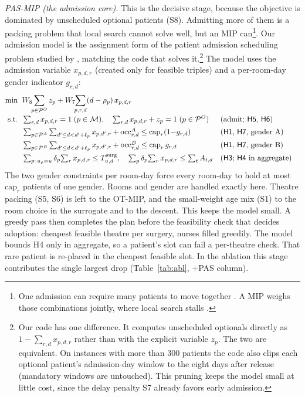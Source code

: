 \documentclass[11pt]{article}
\newcommand{\Sc}[1]{\textsf{S#1}}
\newcommand{\Hc}[1]{\textsf{H#1}}
\begin{document}
	\emph{PAS-MIP (the admission core).} This is the decisive stage, because the objective is dominated
	by unscheduled optional patients (\Sc8). Admitting more of them is a packing problem that local search cannot solve well, but an MIP can\footnote{One admission can require many patients to move together \citep{ceschia2011}. A MIP weighs those combinations jointly, where local search stalls \citep{maniezzo2010}.}. Our admission model is the assignment form of the patient admission scheduling problem studied by \citet{ceschia2011}, matching the code that solves it.\footnote{Our code has one difference. It computes unscheduled optionals directly as $1-\sum_{r,d}x_{p,d,r}$ rather than with the explicit variable $z_p$. The two are equivalent. On instances with more than 300 patients the code also clips each optional patient's admission-day window to the eight days after release (mandatory windows are untouched). This pruning keeps the model small at little cost, since the delay penalty \Sc7 already favors early admission.} The model uses the admission variable $x_{p,d,r}$ (created only for
	feasible triples) and a per-room-day gender indicator $g_{r,d}$:
	{\small
		\begin{align*}
			\min\;\; & W_8\!\!\sum_{p\in\mathcal P^{O}} z_p
			+ W_7\!\!\sum_{p,r,d}(d-\rho_p)\,x_{p,d,r} \\[-2pt]
			\text{s.t.}\;\;
			& \textstyle\sum_{r,d}x_{p,d,r}=1\;(p\in\mathcal M),\quad \sum_{r,d}x_{p,d,r}+z_p=1\;(p\in\mathcal P^{O}) && \text{(admit; \Hc5, \Hc6)}\\
			& \textstyle\sum_{p\in\mathcal P^{A}}\sum_{d'\le d<d'+\ell_p} x_{p,d',r}+\mathrm{occ}^{A}_{r,d}\le \mathrm{cap}_r(1{-}g_{r,d}) && \text{(\Hc1, \Hc7, gender A)}\\
			& \textstyle\sum_{p\in\mathcal P^{B}}\sum_{d'\le d<d'+\ell_p} x_{p,d',r}+\mathrm{occ}^{B}_{r,d}\le \mathrm{cap}_r\,g_{r,d} && \text{(\Hc1, \Hc7, gender B)}\\
			& \textstyle\sum_{p:\,u_p=u}\delta_p\!\sum_r x_{p,d,r}\le T^{\mathrm{surg}}_{u,d},\quad
			\sum_{p}\delta_p\!\sum_r x_{p,d,r}\le \textstyle\sum_t A_{t,d} && \text{(\Hc3; \Hc4 in aggregate)}
	\end{align*}}%
	The two gender constraints per room-day force every room-day to hold at most $\mathrm{cap}_r$
	patients of one gender. Rooms and gender are handled exactly here. Theatre packing (\Sc5, \Sc6) is left to the OT-MIP, and the small-weight age mix (\Sc1) to the room choice in the surrogate and to the descent. This keeps the model small. A greedy pass then completes the plan before the feasibility check that decides adoption: cheapest feasible theatre per surgery, nurses filled greedily. The model bounds \Hc4 only in aggregate, so a patient's slot can fail a per-theatre check. That rare patient is re-placed in the cheapest feasible slot. In the
	ablation this stage contributes the single largest drop (Table~\ref{tab:abl}, +PAS column).
	
\end{document}
